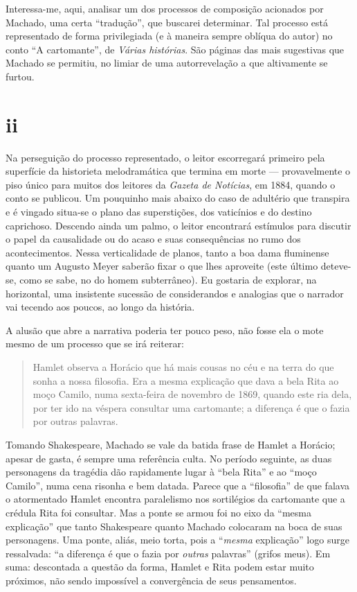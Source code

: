 Interessa-me, aqui, analisar um dos processos de composição acionados
por Machado, uma certa ``tradução'', que buscarei determinar. Tal
processo está representado de forma privilegiada (e à maneira sempre
oblíqua do autor) no conto ``A cartomante'', de \emph{Várias histórias}.
São páginas das mais sugestivas que Machado se permitiu, no limiar de
uma autorrevelação a que altivamente se furtou.

\section*{ii}

Na perseguição do processo representado, o leitor escorregará primeiro
pela superfície da historieta melodramática que termina em morte ---
provavelmente o piso único para muitos dos leitores da \emph{Gazeta de
Notícias}, em 1884, quando o conto se publicou. Um pouquinho mais abaixo
do caso de adultério que transpira e é vingado situa-se o plano das
superstições, dos vaticínios e do destino caprichoso. Descendo ainda um
palmo, o leitor encontrará estímulos para discutir o papel da
causalidade ou do acaso e suas consequências no rumo dos acontecimentos.
Nessa verticalidade de planos, tanto a boa dama fluminense quanto um
Augusto Meyer saberão fixar o que lhes aproveite (este último deteve-se,
como se sabe, no do homem subterrâneo). Eu gostaria de explorar, na
horizontal, uma insistente sucessão de considerandos e analogias que o
narrador vai tecendo aos poucos, ao longo da história.

A alusão que abre a narrativa poderia ter pouco peso, não fosse ela o
mote mesmo de um processo que se irá reiterar:

\begin{quote}
Hamlet observa a Horácio que há mais cousas no céu e na terra do que
sonha a nossa filosofia. Era a mesma explicação que dava a bela Rita ao
moço Camilo, numa sexta-feira de novembro de 1869, quando este ria dela,
por ter ido na véspera consultar uma cartomante; a diferença é que o
fazia por outras palavras.
\end{quote}

Tomando Shakespeare, Machado se vale da batida frase de Hamlet a
Horácio; apesar de gasta, é sempre uma referência culta. No período
seguinte, as duas personagens da tragédia dão rapidamente lugar à ``bela
Rita'' e ao ``moço Camilo'', numa cena risonha e bem datada. Parece que
a ``filosofia'' de que falava o atormentado Hamlet encontra paralelismo
nos sortilégios da cartomante que a crédula Rita foi consultar. Mas a
ponte se armou foi no eixo da ``mesma explicação'' que tanto Shakespeare
quanto Machado colocaram na boca de suas personagens. Uma ponte, aliás,
meio torta, pois a ``\emph{mesma} explicação'' logo surge ressalvada:
``a diferença é que o fazia por \emph{outras} palavras'' (grifos meus).
Em suma: descontada a questão da forma, Hamlet e Rita podem estar muito
próximos, não sendo impossível a convergência de seus pensamentos.

